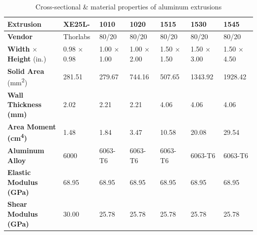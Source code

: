 \begin{table}[htbp]
    \renewcommand{\arraystretch}{1.2}
    \caption{Cross-sectional \& material properties of aluminum extrusions \cite{ho1997structural}}
    \begin{center}
        \begin{tabular}{ l l l l l l l }
        \toprule[2pt]
        \textbf{Extrusion} & \textbf{XE25L-} & \textbf{1010} & \textbf{1020} & \textbf{1515} & \textbf{1530} & \textbf{1545} \\
        \midrule[0.75pt]
        \textbf{Vendor} & Thorlabs & 80/20 & 80/20 & 80/20 & 80/20 & 80/20 \\
        \textbf{Width} $\times$ \textbf{Height} ($\text{in.}$) & 0.98 $\times$ 0.98 & 1.00 $\times$ 1.00 & 1.00 $\times$ 2.00 & 1.50 $\times$ 1.50 & 1.50 $\times$ 3.00 & 1.50 $\times$ 4.50 \\
        \textbf{Solid Area} (\si{\mm^2}) & 281.51 & 279.67 & 744.16 & 507.65 & 1343.92 & 1928.42 \\
        \textbf{Wall Thickness (\si{\mm})} & 2.02 & 2.21 & 2.21 & 4.06 & 4.06 & 4.06 \\
        \textbf{Area Moment (\si{\cm^4})} & 1.48 & 1.84 & 3.47 & 10.58 & 20.08 & 29.54 \\
        \textbf{Aluminum Alloy} & 6000 & 6063-T6 & 6063-T6 & 6063-T6 & 6063-T6 & 6063-T6 \\
        \textbf{Elastic Modulus (\si{\GPa})} & 68.95 & 68.95 & 68.95 & 68.95 & 68.95 & 68.95 \\ 
        \textbf{Shear Modulus (\si{\GPa})} & 30.00 & 25.78 & 25.78 & 25.78 & 25.78 & 25.78 \\
        \bottomrule[2pt]
        \end{tabular}
    \end{center}
    \label{tab:sections}
\end{table}

